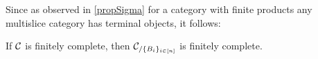 Since as observed in \ref{propSigma} for a category with finite products any multislice category has terminal objects, it follows:
\begin{proposition} \label{finitelycomplete}
If $\mathcal{C}$ is finitely complete, then $\mathcal{C}_{/\{B_i\}_{ i \in [n]}}$ is finitely complete.
\cqd
\end{proposition}

\begin{comment}
\begin{proposition} \label{reflexepi}
The functor $\Sigma$ reflex and preserves strict epimorphism.
\end{proposition}
\begin{proof}
Let $(X \mr{x} B) \mr{f} (Y \mr{y} B)$ be an arrow in 
$\cc{C}_{/B}$. We will argue below referring to the following diagram:
$$
\xymatrix
    {
     C \ar@<.5ex>[r]^r 
       \ar@<-.5ex>[r]_s 
       \ar@/_1.3pc/[ddrr]^{c} 
   & X \ar[rr]^f 
       \ar[dr]^g 
       \ar@/_/[ddr]^{x} 
  && Y \ar@/^/[ddl]^{y} 
       \ar[dl]_{h}
\\ 
  && Z \ar[d]^{z} 
  & 
\\
  && B 	
  &		  
     }
$$
\emph{reflex}: Assume $f$ is a strict epimorphism in $\cc{C}$. Let 
$C \mrpair{r}{s} X$ any two arrows in $\cc{C}$, and
$(X \mr{x} B) \mr{g} (Z \mr{z} B)$ a $f$-compatible arrow in $\cc{C}_{/B}$. Composing with $x$ we have $C \mrpair{xr}{xs} B$, so that $r,\;s$ determine arrows in  
$\cc{C}_{/B}$. This shows that $g$ is also \mbox{$f$-compatible} in 
$\cc{C}$, so we have a unique arrow $h$ such that $hf = g$ in $\cc{C}$. Since $f$ is also an epimorphism, it follows that $zh = y$, thus $h$ is an arrow in $\cc{C}_{/B}$.

\vspace{1ex}

\noindent \emph{preserves}: Assume $f$ is a strict epimorphism in 
$\cc{C}_{/B}$.
Let $C \mrpair{r}{s} X$ be any two arrows in $\cc{C}$, as before they determine two arrows in $\cc{C}_{/B}$, and let 
$(X \mr{x} B) \mr{g} (Z \mr{z} B)$ be a $f$-compatible arrow  in 
$\cc{C}_{/B}$. It follows there is a unique $h$, $hf = g$ in $\cc{C}_{/B}$, and since the functor  
$\Sigma$ is faithful, $h$ is also uniqe in $\cc{C}$. 
\end{proof}
\end{comment}

